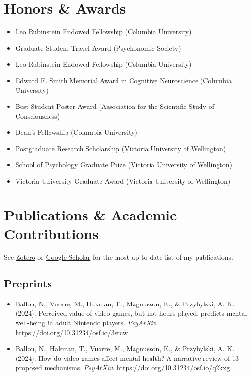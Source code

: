 \documentclass[12pt, a4paper]{article}
\newcommand{\years}[1]{\marginnote{\scriptsize #1}}
\begin{document}
\section*{Honors \& Awards}
\begin{itemize}
  \item \years{2016}Leo Rubinstein Endowed Fellowship (Columbia University)
  \item Graduate Student Travel Award (Psychonomic Society)
  \item \years{2015}Leo Rubinstein Endowed Fellowship (Columbia University)
  \item Edward E. Smith Memorial Award in Cognitive Neuroscience (Columbia University)
  \item Best Student Poster Award (Association for the Scientific Study of Consciousness)
  \item \years{2013}Dean's Fellowship (Columbia University)
  \item \years{2012}Postgraduate Research Scholarship (Victoria University of Wellington)
  \item School of Psychology Graduate Prize (Victoria University of Wellington)
  \item Victoria University Graduate Award (Victoria University of Wellington)
\end{itemize}

\section*{Publications \& Academic Contributions}
See \href{https://www.zotero.org/vuorre}{Zotero} or \href{https://scholar.google.com/citations?hl=en&user=I4DSy-8AAAAJ&view_op=list_works&sortby=pubdate}{Google Scholar} for the most up-to-date list of my publications.

\subsection*{Preprints}
\begin{itemize}
  \item Ballou, N., Vuorre, M., Hakman, T., Magnusson, K., \& Przybylski, A. K. (2024). Perceived value of video games, but not hours played, predicts mental well-being in adult Nintendo players. \emph{PsyArXiv}. \url{https://doi.org/10.31234/osf.io/3srcw}
  \item Ballou, N., Hakman, T., Vuorre, M., Magnusson, K., \& Przybylski, A. K. (2024). How do video games affect mental health? A narrative review of 13 proposed mechanisms. \emph{PsyArXiv}. \url{https://doi.org/10.31234/osf.io/q2kxg}
\end{itemize}
\end{document}
